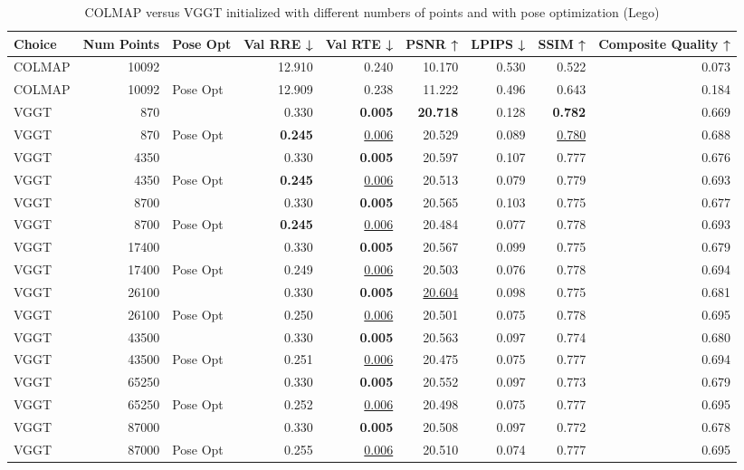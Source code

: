 \begin{table}[H]
\caption{COLMAP versus VGGT initialized with different numbers of points and with pose optimization (Lego)}
\label{tab:02_num_points_pose_opt_lego}
\begin{tabular}{lrlrrrrrr}
\toprule
Choice & Num Points & Pose Opt & Val RRE ↓ & Val RTE ↓ & PSNR ↑ & LPIPS ↓ & SSIM ↑ & Composite Quality ↑ \\
\midrule
COLMAP & 10092 &  & 12.910 & 0.240 & 10.170 & 0.530 & 0.522 & 0.073 \\
COLMAP & 10092 & Pose Opt & 12.909 & 0.238 & 11.222 & 0.496 & 0.643 & 0.184 \\
VGGT & 870 &  & 0.330 & \textbf{0.005} & \textbf{20.718} & 0.128 & \textbf{0.782} & 0.669 \\
VGGT & 870 & Pose Opt & \textbf{0.245} & \underline{0.006} & 20.529 & 0.089 & \underline{0.780} & 0.688 \\
VGGT & 4350 &  & 0.330 & \textbf{0.005} & 20.597 & 0.107 & 0.777 & 0.676 \\
VGGT & 4350 & Pose Opt & \textbf{0.245} & \underline{0.006} & 20.513 & 0.079 & 0.779 & 0.693 \\
VGGT & 8700 &  & 0.330 & \textbf{0.005} & 20.565 & 0.103 & 0.775 & 0.677 \\
VGGT & 8700 & Pose Opt & \textbf{0.245} & \underline{0.006} & 20.484 & 0.077 & 0.778 & 0.693 \\
VGGT & 17400 &  & 0.330 & \textbf{0.005} & 20.567 & 0.099 & 0.775 & 0.679 \\
VGGT & 17400 & Pose Opt & 0.249 & \underline{0.006} & 20.503 & 0.076 & 0.778 & 0.694 \\
VGGT & 26100 &  & 0.330 & \textbf{0.005} & \underline{20.604} & 0.098 & 0.775 & 0.681 \\
VGGT & 26100 & Pose Opt & 0.250 & \underline{0.006} & 20.501 & 0.075 & 0.778 & 0.695 \\
VGGT & 43500 &  & 0.330 & \textbf{0.005} & 20.563 & 0.097 & 0.774 & 0.680 \\
VGGT & 43500 & Pose Opt & 0.251 & \underline{0.006} & 20.475 & 0.075 & 0.777 & 0.694 \\
VGGT & 65250 &  & 0.330 & \textbf{0.005} & 20.552 & 0.097 & 0.773 & 0.679 \\
VGGT & 65250 & Pose Opt & 0.252 & \underline{0.006} & 20.498 & 0.075 & 0.777 & 0.695 \\
VGGT & 87000 &  & 0.330 & \textbf{0.005} & 20.508 & 0.097 & 0.772 & 0.678 \\
VGGT & 87000 & Pose Opt & 0.255 & \underline{0.006} & 20.510 & 0.074 & 0.777 & 0.695 \\

\end{tabular}
\end{table}
